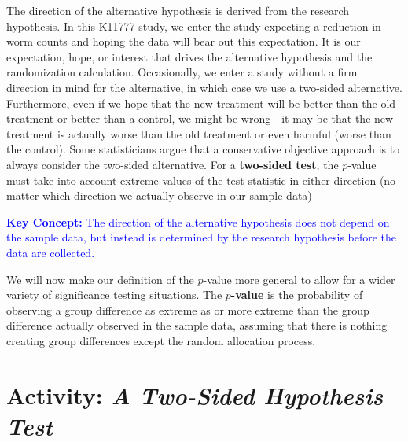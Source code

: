 \documentclass[
]{report}
\begin{document}
The direction of the alternative hypothesis is derived from the research hypothesis. In this K11777 study, we enter the study expecting a reduction in worm counts and hoping the data will bear out this expectation. It is our expectation, hope, or interest that drives the alternative hypothesis and the randomization calculation. Occasionally,
we enter a study without a firm direction in mind for the alternative, in which case we use a two-sided alternative. Furthermore, even if we hope that the new treatment will be better than the old treatment or better than a control, we might be wrong---it may be that the new treatment is actually worse than the old treatment or even harmful (worse than the control). Some statisticians argue that a conservative objective approach is to
always consider the two-sided alternative. For a \textbf{two-sided test}, the \(p\)-value must take into account extreme values of the test statistic in either direction (no matter which direction we actually observe in our sample data)

\textbf{\textcolor{blue}{Key Concept:}}
\textcolor{blue}{The direction of the alternative hypothesis does not depend on the sample data, but instead is determined by the research hypothesis before the data are collected.}

We will now make our definition of the \(p\)-value more general to allow for a wider variety of significance testing situations. The \textbf{\(p\)-value} is the probability of observing a group difference as extreme as or more extreme than the group difference actually observed in the sample data, assuming that there is nothing creating group
differences except the random allocation process.

\hypertarget{activity-a-two-sided-hypothesis-test}{%
\section*{\texorpdfstring{Activity: \emph{A Two-Sided Hypothesis Test}}{Activity: A Two-Sided Hypothesis Test}}\label{activity-a-two-sided-hypothesis-test}}
\end{document}
